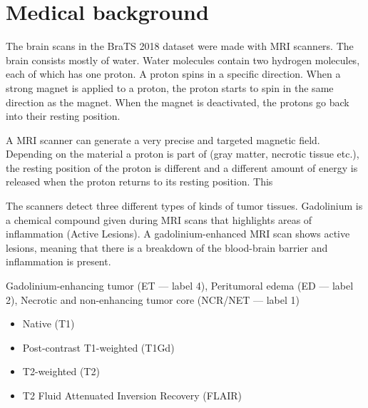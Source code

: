 \section{Medical background}
The brain scans in the BraTS 2018 dataset were made with MRI scanners\cite{mriscanner}.
The brain consists mostly of water. Water molecules contain two hydrogen molecules, each of which has one proton. A proton spins in a specific direction. When a strong magnet is applied to a proton, the proton starts to spin in the same direction as the magnet. When the magnet is deactivated, the protons go back into their resting position. 

A MRI scanner can generate a very precise and targeted magnetic field. Depending on the material a proton is part of (gray matter, necrotic tissue etc.), the resting position of the proton is different and a different amount of energy is released when the proton returns to its resting position. This

The scanners detect three different types of kinds of tumor tissues. 
Gadolinium is a chemical compound given during MRI scans that highlights areas of inflammation (Active Lesions). A gadolinium-enhanced  MRI scan shows active lesions, meaning that there is a breakdown of the blood-brain barrier and inflammation is present.

Gadolinium-enhancing tumor (ET — label 4),
Peritumoral edema (ED — label 2),
Necrotic and non-enhancing tumor core (NCR/NET — label 1)

\begin{itemize}
    \item Native (T1)
    \item Post-contrast T1-weighted (T1Gd)
    \item T2-weighted (T2)
    \item T2 Fluid Attenuated Inversion Recovery (FLAIR)
\end{itemize}
